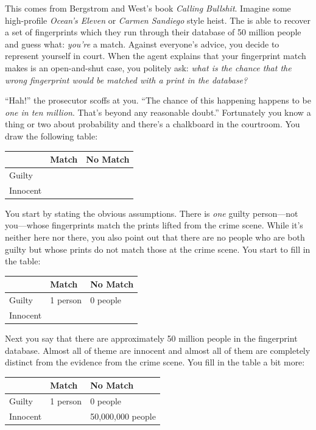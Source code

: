 This comes from Bergstrom and West's book \emph{Calling Bullshit}. Imagine some high-profile \emph{Ocean's Eleven} or \emph{Carmen Sandiego} style heist. The  is able to recover a set of fingerprints which they run through their database of 50 million people and guess what: \emph{you're} a match. Against everyone's advice, you decide to represent yourself in court. When the  agent explains that your fingerprint match makes is an open-and-shut case, you politely ask: \emph{what is the chance that the wrong fingerprint would be matched with a print in the database?}

``Hah!'' the prosecutor scoffs at you. ``The chance of this happening happens to be \emph{one in ten million}. That's beyond any reasonable doubt.'' Fortunately you know a thing or two about probability and there's a chalkboard in the courtroom. You draw the following table:
\begin{center}
\begin{tabular}{l|ll} \toprule %
		& Match & No Match
		\\ \hline
		Guilty & \phantom{1 person} & \phantom{0 people}
		\\
		Innocent & \phantom{5 person} & \phantom{50,000,000 people}
		\\ \bottomrule
\end{tabular}
\end{center}
You start by stating the obvious assumptions. There is \emph{one} guilty person---not you---whose fingerprints match the prints lifted from the crime scene. While it's neither here nor there, you also point out that there are no people who are both guilty but whose prints do not match those at the crime scene. You start to fill in the table:
\begin{center}
\begin{tabular}{l|ll} \toprule %
		& Match & No Match
		\\ \hline
		Guilty & {1 person} & {0 people}
		\\
		Innocent & \phantom{5 person} & \phantom{50,000,000 people}
		\\ \bottomrule
\end{tabular}
\end{center}
Next you say that there are approximately 50 million people in the fingerprint database. Almost all of theme are innocent and almost all of them are completely distinct from the evidence from the crime scene. You fill in the table a bit more:
\begin{center}
\begin{tabular}{l|ll} \toprule %
		& Match & No Match
		\\ \hline
		Guilty & {1 person} & {0 people}
		\\
		Innocent & \phantom{5 person} & {50,000,000 people}
		\\ \bottomrule
\end{tabular}
\end{center}
